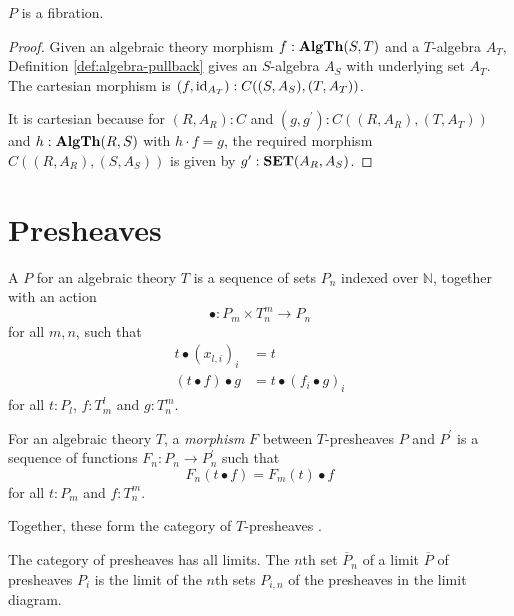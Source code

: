\begin{lemma}\label{lem:algebra-fibration}
  $ P $ is a fibration.
\end{lemma}
\begin{proof}
  Given an algebraic theory morphism $ f: \mathbf{AlgTh}(S, T) $ and a $ T $-algebra $ A_T $, Definition \ref{def:algebra-pullback} gives an $ S $-algebra $ A_S $ with underlying set $ A_T $. The cartesian morphism is $ (f, \text{id}_{A_T}): C((S, A_S), (T, A_T)) $.

  It is cartesian because for $ (R, A_R): C $ and $ (g, g^\prime): C((R, A_R), (T, A_T)) $ and $ h: \mathbf{AlgTh}(R, S) $ with $ h \cdot f = g $, the required morphism $ C((R, A_R), (S, A_S)) $ is given by $ g^\prime: \mathbf{SET}(A_R, A_S) $.
\end{proof}

\section{Presheaves}

\begin{definition}
  A  $ P $ for an algebraic theory $ T $ is a sequence of sets $ P_n $ indexed over $ \mathbb N $, together with an action
  \[ \bullet: P_m \times T_n^m \to P_n \]
  for all $ m, n $, such that
  \begin{align*}
    t \bullet (x_{l, i})_i &= t\\
    (t \bullet f) \bullet g &= t \bullet (f_i \bullet g)_i
  \end{align*}
  for all $ t: P_l $, $ f: T_m^l $ and $ g: T_n^m $.
\end{definition}

\begin{definition}
  For an algebraic theory $ T $, a \textit{morphism} $ F $ between $ T $-presheaves $ P $ and $ P^\prime $ is a sequence of functions $ F_n: P_n \to P^\prime_n $ such that
  \[ F_n(t \bullet f) = F_m(t) \bullet f \]
  for all $ t: P_m $ and $ f: T_n^m $.
\end{definition}

Together, these form the category of $ T $-presheaves .

\begin{remark}
  The category of presheaves has all limits. The $ n $th set $ \overline{P}_n $ of a limit $ \overline{P} $ of presheaves $ P_i $ is the limit of the $ n $th sets $ P_{i, n} $ of the presheaves in the limit diagram.
\end{remark}

